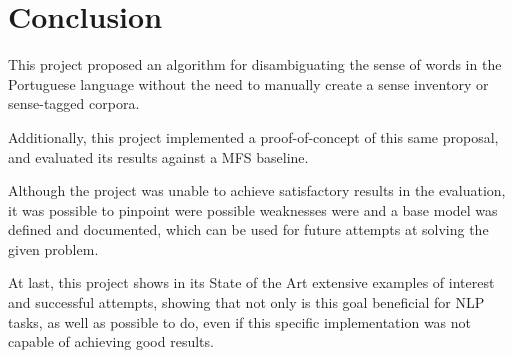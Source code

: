 \chapter{Conclusion}

This project proposed an algorithm for disambiguating the sense of words in the
Portuguese language without the need to manually create a sense inventory or
sense-tagged corpora.

Additionally, this project implemented a proof-of-concept of this same proposal,
and evaluated its results against a \ac{MFS} baseline.

Although the project was unable to achieve satisfactory results in the
evaluation, it was possible to pinpoint were possible weaknesses were and a base
model was defined and documented, which can be used for future attempts at
solving the given problem.

At last, this project shows in its State of the Art extensive examples of
interest and successful attempts, showing that not only is this goal beneficial
for \ac{NLP} tasks, as well as possible to do, even if this specific
implementation was not capable of achieving good results.

